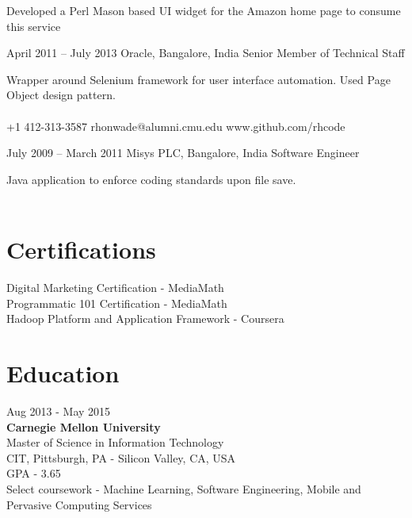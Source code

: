 \documentclass{tccv}
\begin{document}
\begin{eventlist}
Developed a Perl Mason based UI widget for the Amazon home page to consume this service

\item{April 2011 -- July 2013}
     {Oracle, Bangalore, India}
     {Senior Member of Technical Staff}

Wrapper around Selenium framework for user interface automation. Used Page Object design pattern.\\
\\

    {+1 412-313-3587}
    {rhonwade@alumni.cmu.edu}
    {www.github.com/rhcode}

\item{July 2009 -- March 2011}
     {Misys PLC, Bangalore, India}
     {Software Engineer}

Java application to enforce coding standards upon file save.\\
\\

\end{eventlist}

\vspace{-0.3in}
\section{Certifications}
Digital Marketing Certification - MediaMath\\

Programmatic 101 Certification - MediaMath\\

Hadoop Platform and Application Framework - Coursera

\section{Education}

{\hfill\sc Aug 2013 - May 2015}\\
\textbf{Carnegie Mellon University}\\ 
Master of Science in Information Technology\\
CIT, Pittsburgh, PA - Silicon Valley, CA, USA\\
GPA - 3.65\\
Select coursework - Machine Learning, Software Engineering, Mobile and Pervasive Computing Services\\
\end{document}

